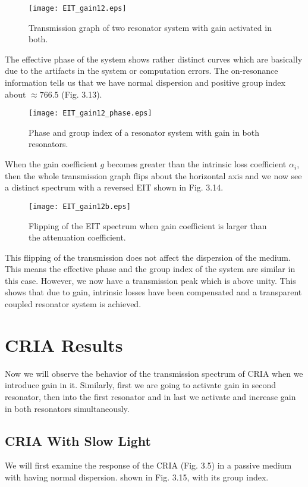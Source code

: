 \begin{figure}[h]
\centering
\texttt{[image: EIT\_gain12.eps]}
\caption{Transmission graph of two resonator system with gain activated in both.}
\end{figure}

The effective phase of the system shows rather distinct curves which are basically due to the artifacts in the system or computation errors. The on-resonance information tells us that we have normal dispersion and positive group index about $\approx 766.5$ (Fig. 3.13). 

\begin{figure}[h]
\centering
\texttt{[image: EIT\_gain12\_phase.eps]}
\caption{Phase and group index of a resonator system with gain in both resonators.}
\end{figure}

When the gain coefficient $g$ becomes greater than the intrinsic loss coefficient $\alpha_{i}$, then the whole transmission graph flips about the horizontal axis and we now see a distinct spectrum with a reversed EIT shown in Fig. 3.14.

\begin{figure}[h]
\centering
\texttt{[image: EIT\_gain12b.eps]}
\caption{Flipping of the EIT spectrum when gain coefficient is larger than the attenuation coefficient.}
\end{figure}

This flipping of the transmission does not affect the dispersion of the medium. This means the effective phase and the group index of the system are similar in this case. However, we now have a transmission peak which is above unity. This shows that due to gain, intrinsic losses have been compensated and a transparent coupled resonator system is achieved.


  

\section{CRIA Results}
Now we will observe the behavior of the transmission spectrum of CRIA when we introduce gain in it. Similarly, first we are going to activate gain in second resonator, then into the first resonator and in last we activate and increase gain in both resonators simultaneously. 

\subsection{CRIA With Slow Light}
We will first examine the response of the CRIA (Fig. 3.5) in a passive medium with having normal dispersion. shown in Fig. 3.15, with its group index.

